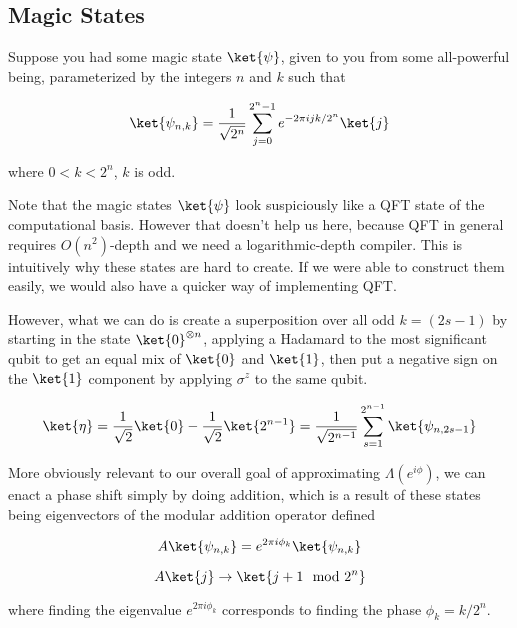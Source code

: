 \subsection{Magic States}
\label{subsec:magic-state}

Suppose you had some magic state $\ket{\psi}$, given to you from some
all-powerful being, parameterized by the
integers $n$ and $k$ such that

\begin{equation*}
\ket{\psi_{n,k}} = \frac{1}{\sqrt{2^n}} \sum_{j=0}^{2^n-1}
e^{-2\pi i j k / 2^n} \ket{j}
\end{equation*}

where $0 < k < 2^n$, $k$ is odd.

Note that the magic states $\ket{\psi}$ look suspiciously like a
QFT state of the computational basis.
However that doesn't help us here, because QFT in general requires
$O(n^2)$-depth and we need a logarithmic-depth compiler.
This is intuitively why these states are hard to create.
If we were able to construct them easily, we would also have a quicker way
of implementing QFT.

However, what we can do is create a superposition over all odd $k=(2s-1)$
by starting in the state $\ket{0}^{\otimes n}$,
applying a Hadamard to the most significant qubit to get an equal mix of $\ket{0}$
and $\ket{1}$, then put a negative sign on the $\ket{1}$ component by applying
$\sigma^z$ to the same qubit.

\begin{equation*}
\ket{\eta} = \normtwo \ket{0} - \normtwo \ket{2^{n-1}} =
\frac{1}{\sqrt{2^{n-1}}} \sum_{s=1}^{2^{n-1}} \ket{\psi_{n,2s-1}}
\end{equation*}

More obviously relevant to our overall goal of approximating
$\Lambda(e^{i\phi})$, we can enact a phase
shift simply by doing addition, which is a result of these states
being eigenvectors of the modular addition operator defined
 
\begin{equation*}
A\ket{\psi_{n,k}} = e^{2\pi i \phi_k} \ket{\psi_{n,k}}
\end{equation*}

\begin{equation*}
A\ket{j} \rightarrow \ket{j+1 \mod 2^n}
\end{equation*}

where finding the eigenvalue $e^{2\pi i \phi_k}$ corresponds to finding
the phase $\phi_k = k / 2^n$.


